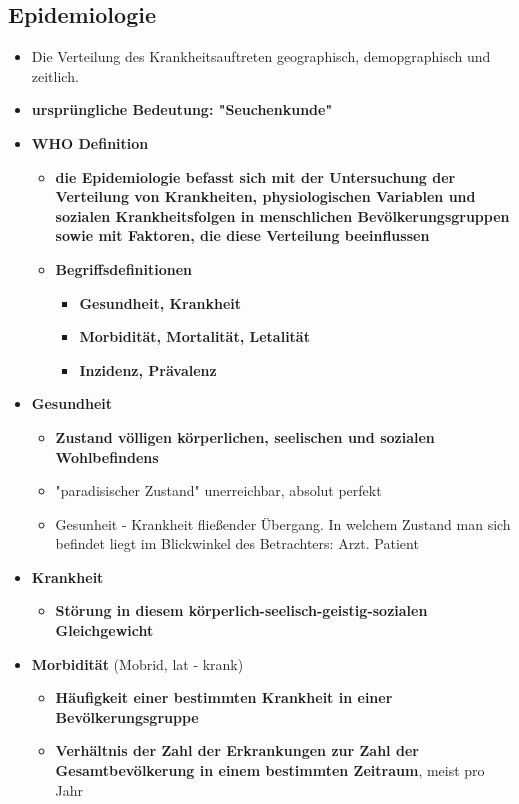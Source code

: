 \subsection{Epidemiologie}
	\begin{itemize}
		\item Die Verteilung des Krankheitsauftreten geographisch, demopgraphisch und zeitlich.
		\item \textbf{ursprüngliche Bedeutung: "Seuchenkunde"}
		\item \textbf{WHO Definition}
			\begin{itemize}
				\item \textbf{die Epidemiologie befasst sich mit der Untersuchung der Verteilung von Krankheiten, physiologischen Variablen und sozialen Krankheitsfolgen in menschlichen Bevölkerungsgruppen sowie mit Faktoren, die diese Verteilung beeinflussen}
				\item \textbf{Begriffsdefinitionen}
					\begin{itemize}
						\item \textbf{Gesundheit, Krankheit}
						\item \textbf{Morbidität, Mortalität, Letalität}
						\item \textbf{Inzidenz, Prävalenz}
					\end{itemize}
			\end{itemize}
		\item \textbf{Gesundheit}
			\begin{itemize}
				\item \textbf{Zustand völligen körperlichen, seelischen und sozialen Wohlbefindens}
				\item "paradisischer Zustand" unerreichbar, absolut perfekt
				\item Gesunheit - Krankheit fließender Übergang. In welchem Zustand man sich befindet liegt im Blickwinkel des Betrachters: Arzt. Patient
			\end{itemize}
		\item \textbf{Krankheit}
			\begin{itemize}
				\item \textbf{Störung in diesem körperlich-seelisch-geistig-sozialen Gleichgewicht}
			\end{itemize}
		\item \textbf{Morbidität} (Mobrid, lat - krank)
			\begin{itemize}
				\item \textbf{Häufigkeit einer bestimmten Krankheit in einer Bevölkerungsgruppe}
				\item \textbf{Verhältnis der Zahl der Erkrankungen zur Zahl der Gesamtbevölkerung in einem bestimmten Zeitraum}, meist pro Jahr

\end{itemize}
\end{itemize}
